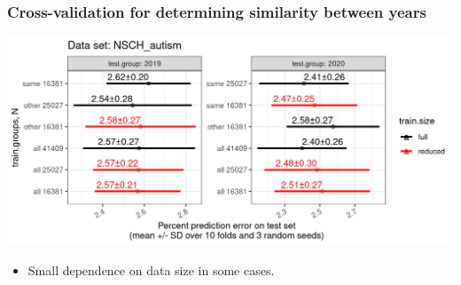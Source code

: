 \documentclass{beamer}
\begin{document}
\begin{frame}
  \frametitle{Cross-validation for determining similarity between years}
  \includegraphics[width=\textwidth]{figures-same-other/NSCH_autism_error_mean_sd_more.png}
  \begin{itemize}
  \item Small dependence on data size in some cases.
  \end{itemize}
\end{frame}
\end{document}
